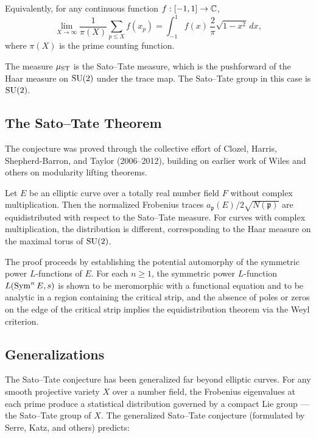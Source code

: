 Equivalently, for any continuous function \(f: [-1, 1] \to \mathbb{C}\),
\[
\lim_{X \to \infty} \frac{1}{\pi(X)} \sum_{p \leq X} f(x_p) = \int_{-1}^{1} f(x) \, \frac{2}{\pi} \sqrt{1-x^2} \, dx,
\]
where \(\pi(X)\) is the prime counting function.

The measure \(\mu_{\operatorname{ST}}\) is the Sato--Tate measure, which is the pushforward of the Haar measure on \(\operatorname{SU}(2)\) under the trace map. The Sato--Tate group in this case is \(\operatorname{SU}(2)\).

\subsection{The Sato--Tate Theorem}

The conjecture was proved through the collective effort of Clozel, Harris, Shepherd-Barron, and Taylor (2006--2012), building on earlier work of Wiles and others on modularity lifting theorems.

\begin{theorem}
Let \(E\) be an elliptic curve over a totally real number field \(F\) without complex multiplication. Then the normalized Frobenius traces \(a_{\mathfrak{p}}(E)/2\sqrt{N(\mathfrak{p})}\) are equidistributed with respect to the Sato--Tate measure. For curves with complex multiplication, the distribution is different, corresponding to the Haar measure on the maximal torus of \(\operatorname{SU}(2)\).
\end{theorem}

The proof proceeds by establishing the potential automorphy of the symmetric power \(L\)-functions of \(E\). For each \(n \geq 1\), the symmetric power \(L\)-function \(L(\operatorname{Sym}^n E, s)\) is shown to be meromorphic with a functional equation and to be analytic in a region containing the critical strip, and the absence of poles or zeros on the edge of the critical strip implies the equidistribution theorem via the Weyl criterion.

\subsection{Generalizations}

The Sato--Tate conjecture has been generalized far beyond elliptic curves. For any smooth projective variety \(X\) over a number field, the Frobenius eigenvalues at each prime produce a statistical distribution governed by a compact Lie group --- the Sato--Tate group of \(X\). The generalized Sato--Tate conjecture (formulated by Serre, Katz, and others) predicts:

